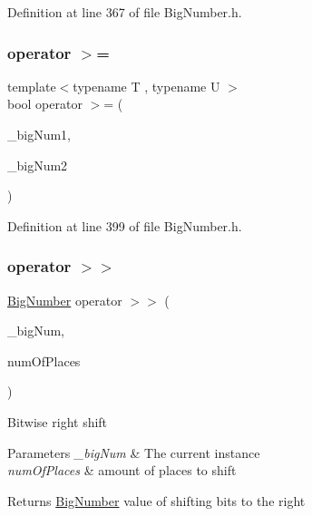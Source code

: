 Definition at line 367 of file Big\+Number.\+h.

\mbox{\label{class_big_nums_1_1_big_number_a7d9aa0ee821fabd568fad397d4274bc8}} 
\subsubsection{\texorpdfstring{operator $>$=}{operator >=}}
{\footnotesize\ttfamily template$<$typename T , typename U $>$ \\
bool operator $>$= (\begin{DoxyParamCaption}\item[{const T \&}]{\+\_\+big\+Num1,  }\item[{const U \&}]{\+\_\+big\+Num2 }\end{DoxyParamCaption})\hspace{0.3cm}{\ttfamily [friend]}}



Definition at line 399 of file Big\+Number.\+h.

\mbox{\label{class_big_nums_1_1_big_number_a79a63ab9c19b4fc86b225bbaba7435f3}} 
\subsubsection{\texorpdfstring{operator $>$$>$}{operator >>}}
{\footnotesize\ttfamily \mbox{\hyperlink{class_big_nums_1_1_big_number}{Big\+Number}} operator $>$$>$ (\begin{DoxyParamCaption}\item[{const \mbox{\hyperlink{class_big_nums_1_1_big_number}{Big\+Number}} \&}]{\+\_\+big\+Num,  }\item[{int}]{num\+Of\+Places }\end{DoxyParamCaption})\hspace{0.3cm}{\ttfamily [friend]}}

Bitwise right shift 
\begin{DoxyParams}{Parameters}
{\em \+\_\+big\+Num} & The current instance \\
\hline
{\em num\+Of\+Places} & amount of places to shift \\
\hline
\end{DoxyParams}
\begin{DoxyReturn}{Returns}
\mbox{\hyperlink{class_big_nums_1_1_big_number}{Big\+Number}} value of shifting bits to the right 
\end{DoxyReturn}


